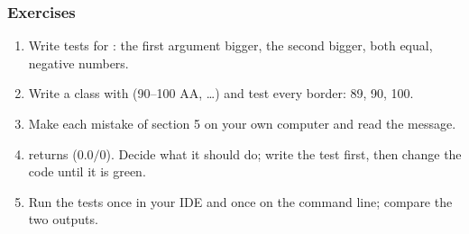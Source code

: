 \documentclass[aspectratio=169,10pt,compress]{beamer}
\begin{document}
\begin{frame}[t,fragile] \frametitle{Exercises}
  \begin{enumerate}\small
    \item Write tests for : the first argument bigger, the second bigger, both equal, negative numbers.
    \item Write a class  with  (90--100 AA, \dots) and test every border: 89, 90, 100.
    \item Make each mistake of section 5 on your own computer and read the message.
    \item {} returns  ($0.0 / 0$). Decide what it should do; write the test first, then change the code until it is green.
    \item Run the tests once in your IDE and once on the command line; compare the two outputs.
  \end{enumerate}
\end{frame}




\begin{frame}[t,fragile]
	\begin{center}
		\vspace{4cm}
	\end{center}
\end{frame}
\end{document}
